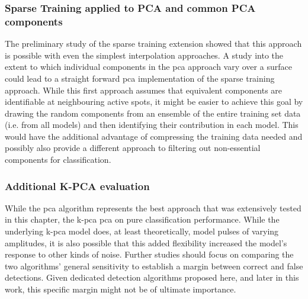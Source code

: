 \DIFaddend %
\subsubsection{Sparse Training applied to PCA and common PCA components}
The preliminary study of the sparse training extension showed that this approach is possible with even the simplest interpolation approaches. A study into the extent to which individual components in the \DIFdelbegin {}\DIFdelend \DIFaddbegin \gls{pca} \DIFaddend approach vary over a surface could lead to a straight forward \DIFdelbegin {}\DIFdelend \DIFaddbegin \gls{pca} \DIFaddend implementation of the sparse training approach. While this first approach assumes that equivalent components are identifiable at neighbouring active spots, it might be easier to achieve this goal by drawing the random components from an ensemble of the entire training set data (i.e. from all models) and then identifying their contribution in each model. This would have the additional advantage of compressing the training data needed and possibly also provide a different approach to filtering out non-essential components for classification.

\subsubsection{Additional K-PCA evaluation}
While the \DIFdelbegin {}\DIFdelend \DIFaddbegin \gls{pca} \DIFaddend algorithm represents the best approach that was extensively tested in this chapter, the \DIFdelbegin {}\DIFdelend \DIFaddbegin \gls{k-pca} \gls{pca} \DIFaddend on pure classification performance. While the underlying \DIFdelbegin {}\DIFdelend \DIFaddbegin \gls{k-pca} \DIFaddend model does, at least theoretically, model pulses of varying amplitudes, it is also possible that this added flexibility increased the model's response to other kinds of noise. Further studies should focus on comparing the two algorithms' general sensitivity to establish a margin between correct and false detections. Given dedicated detection algorithms proposed here, and later in this work, this specific margin might not be of ultimate importance.

